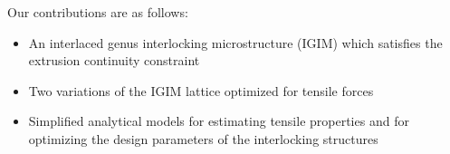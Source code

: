 Our contributions are as follows:
\begin{itemize}
	\item An interlaced genus interlocking microstructure (IGIM) which satisfies the extrusion continuity constraint
	\item Two variations of the IGIM lattice optimized for tensile forces
	\item Simplified analytical models for estimating tensile properties and for optimizing the design parameters of the interlocking structures
\end{itemize}










